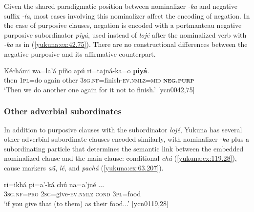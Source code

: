 \documentclass[output=paper,colorlinks,citecolor=brown]{langscibook}
\begin{document}
Given the shared paradigmatic position between nominalizer \textit{-ka} and negative suffix \textit{-la}, most cases involving this nominalizer affect the encoding of negation. In the case of purposive clauses, negation is encoded with a portmanteau negative purposive subordinator \textit{piyá}, used instead of \textit{lojé} after the nominalized verb with \textit{-ka} as in (\ref{yukuna:ex:42.75}). There are no constructional differences between the negative purposive and its affirmative counterpart. 

\ea\label{yukuna:ex:42.75}
\gll Kéchámi wa=la'á píño apú 	ri=tajná-ka=o \textbf{piyá}.\\
then \textsc{1pl}=do again other \textsc{3sg.nf}=finish-\textsc{ev.nmlz}=\textsc{mid}  \textbf{\textsc{neg.purp}} \\
\glt ‘Then we do another one again for it not to finish.’ [ycn0042,75]
\z

\subsubsection{Other adverbial subordinates}\label{yukuna:other.advz}

In addition to purposive clauses with the subordinator \textit{lojé}, Yukuna has several other adverbial subordinate clauses encoded similarly, with nominalizer -\textit{ka} plus a subordinating particle that determines the semantic link between the embedded nominalized clause and the main clause: conditional \textit{chú} (\ref{yukuna:ex:119.28}), cause markers \textit{aṹ}, \textit{lé}, and \textit{pachá} (\ref{yukuna:ex:63.207}).

\ea\label{yukuna:ex:119.28}
\gll ri=ikhá pi=a'-ká chú na=a'jné {...}\\
\textsc{3sg.nf=pro} \textsc{2sg}=give-\textsc{ev.nmlz} \textsc{cond} \textsc{3pl}=food \\
\glt ‘if you give that (to them) as their food...’ [ycn0119,28]
\z
\end{document}
